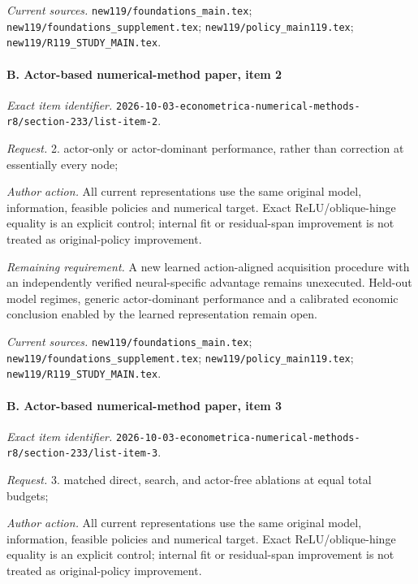 \par\emph{Current sources.} \nolinkurl{new119/foundations_main.tex}; \nolinkurl{new119/foundations_supplement.tex}; \nolinkurl{new119/policy_main119.tex}; \nolinkurl{new119/R119_STUDY_MAIN.tex}.

\paragraph{B. Actor-based numerical-method paper, item 2}

\emph{Exact item identifier.} \nolinkurl{2026-10-03-econometrica-numerical-methods-r8/section-233/list-item-2}.

\par\emph{Request.} 2. actor-only or actor-dominant performance, rather than correction at essentially every node;

\par\emph{Author action.} All current representations use the same original model, information, feasible policies and numerical target. Exact ReLU/\allowbreak{}oblique-hinge equality is an explicit control; internal fit or residual-span improvement is not treated as original-policy improvement.

\par\emph{Remaining requirement.} A new learned action-aligned acquisition procedure with an independently verified neural-specific advantage remains unexecuted. Held-out model regimes, generic actor-dominant performance and a calibrated economic conclusion enabled by the learned representation remain open.

\par\emph{Current sources.} \nolinkurl{new119/foundations_main.tex}; \nolinkurl{new119/foundations_supplement.tex}; \nolinkurl{new119/policy_main119.tex}; \nolinkurl{new119/R119_STUDY_MAIN.tex}.

\paragraph{B. Actor-based numerical-method paper, item 3}

\emph{Exact item identifier.} \nolinkurl{2026-10-03-econometrica-numerical-methods-r8/section-233/list-item-3}.

\par\emph{Request.} 3. matched direct, search, and actor-free ablations at equal total budgets;

\par\emph{Author action.} All current representations use the same original model, information, feasible policies and numerical target. Exact ReLU/\allowbreak{}oblique-hinge equality is an explicit control; internal fit or residual-span improvement is not treated as original-policy improvement.

